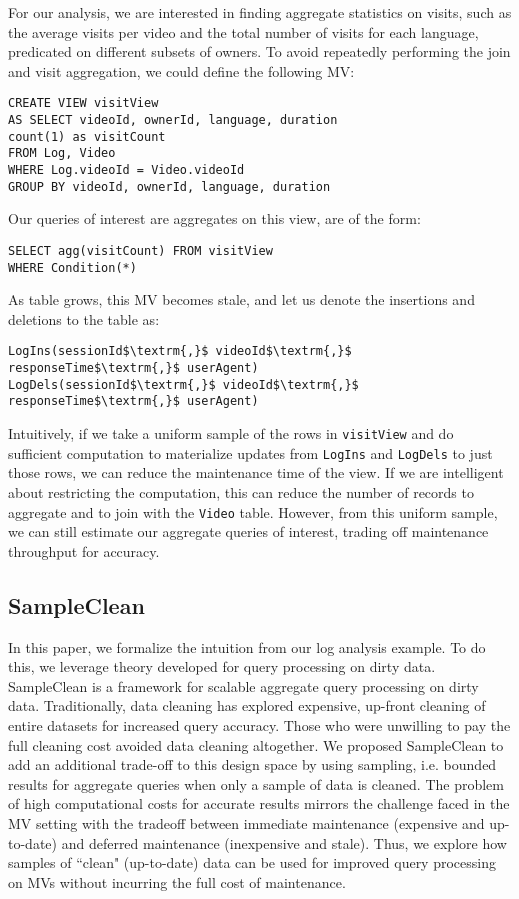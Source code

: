 For our analysis, we are interested in finding aggregate statistics on visits, such as the average visits per video and the total number of visits for each language, predicated on different subsets of owners. 
To avoid repeatedly performing the join and visit aggregation, we could define the following MV:
\begin{lstlisting}[mathescape,basicstyle={\scriptsize}]
CREATE VIEW visitView
AS SELECT videoId, ownerId, language, duration
count(1) as visitCount
FROM Log, Video
WHERE Log.videoId = Video.videoId
GROUP BY videoId, ownerId, language, duration
\end{lstlisting}
Our queries of interest are aggregates on this view, are of the form:
\begin{lstlisting}[mathescape,basicstyle={\scriptsize}]
SELECT agg(visitCount) FROM visitView 
WHERE Condition(*)
\end{lstlisting}

As  table grows, this MV becomes stale, and let us denote the insertions and deletions to the table as:
\begin{lstlisting}[mathescape,basicstyle={\scriptsize}]
LogIns(sessionId$\textrm{,}$ videoId$\textrm{,}$ responseTime$\textrm{,}$ userAgent)
LogDels(sessionId$\textrm{,}$ videoId$\textrm{,}$ responseTime$\textrm{,}$ userAgent)
\end{lstlisting}
Intuitively, if we take a uniform sample of the rows in \texttt{visitView} and do sufficient computation to materialize updates from \texttt{LogIns} and \texttt{LogDels} to just those rows, we can reduce the maintenance time of the view.
If we are intelligent about restricting the computation, this can reduce the number of  records to aggregate and to join with the \texttt{Video} table.
However, from this uniform sample, we can still estimate our aggregate queries of interest, trading off maintenance throughput for accuracy.

\subsection{SampleClean~\cite{wang1999sample}}
In this paper, we formalize the intuition from our log analysis example. 
To do this, we leverage theory developed for query processing on dirty data.
SampleClean is a framework for scalable aggregate query processing on dirty data.
Traditionally, data cleaning has explored expensive, up-front cleaning of entire datasets for increased query accuracy.
Those who were unwilling to pay the full cleaning cost avoided data cleaning altogether.
We proposed SampleClean to add an additional trade-off to this design space by using sampling, i.e. bounded results for aggregate queries when only a sample of data is cleaned.
The problem of high computational costs for accurate results mirrors the challenge faced in the MV setting with the tradeoff between immediate maintenance (expensive and up-to-date) and deferred maintenance (inexpensive and stale). 
Thus, we explore how samples of ``clean" (up-to-date) data can be used for improved query processing on MVs without incurring the full cost of maintenance.

